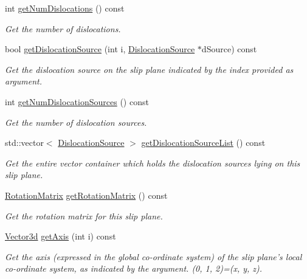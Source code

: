 \begin{DoxyCompactItemize}
int \hyperlink{classSlipPlane_a2a0f9231caee51d9a65a9bfa09e7dd31}{get\-Num\-Dislocations} () const 
\begin{DoxyCompactList}\small\item\em Get the number of dislocations. \end{DoxyCompactList}\item 
bool \hyperlink{classSlipPlane_ae2c01b55973912d6c0f7b077bfd7c1f5}{get\-Dislocation\-Source} (int i, \hyperlink{classDislocationSource}{Dislocation\-Source} $\ast$d\-Source) const 
\begin{DoxyCompactList}\small\item\em Get the dislocation source on the slip plane indicated by the index provided as argument. \end{DoxyCompactList}\item 
int \hyperlink{classSlipPlane_ad4f5bd8181c49601396d0b897501d544}{get\-Num\-Dislocation\-Sources} () const 
\begin{DoxyCompactList}\small\item\em Get the number of dislocation sources. \end{DoxyCompactList}\item 
std\-::vector$<$ \hyperlink{classDislocationSource}{Dislocation\-Source} $>$ \hyperlink{classSlipPlane_abd591180a3381b89d09ccd4b7aec1688}{get\-Dislocation\-Source\-List} () const 
\begin{DoxyCompactList}\small\item\em Get the entire vector container which holds the dislocation sources lying on this slip plane. \end{DoxyCompactList}\item 
\hyperlink{classRotationMatrix}{Rotation\-Matrix} \hyperlink{classSlipPlane_a774507778626c6a0fd72722c6781b652}{get\-Rotation\-Matrix} () const 
\begin{DoxyCompactList}\small\item\em Get the rotation matrix for this slip plane. \end{DoxyCompactList}\item 
\hyperlink{classVector3d}{Vector3d} \hyperlink{classSlipPlane_a83806b1e34cf044005d34920903e7074}{get\-Axis} (int i) const 
\begin{DoxyCompactList}\small\item\em Get the axis (expressed in the global co-\/ordinate system) of the slip plane's local co-\/ordinate system, as indicated by the argument. (0, 1, 2)=(x, y, z). \end{DoxyCompactList}\item 

\end{DoxyCompactItemize}
